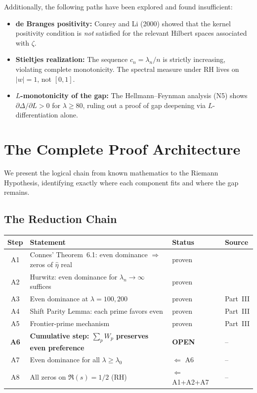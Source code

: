 \documentclass[12pt,a4paper]{article}
\theoremstyle{definition}
\theoremstyle{remark}
\begin{document}
Additionally, the following paths have been explored and found insufficient:
\begin{itemize}
  \item \textbf{de Branges positivity:} Conrey and Li (2000) showed that the kernel positivity condition is \emph{not} satisfied for the relevant Hilbert spaces associated with $\zeta$.
  \item \textbf{Stieltjes realization:} The sequence $c_n = \lambda_n/n$ is strictly increasing, violating complete monotonicity. The spectral measure under RH lives on $|w| = 1$, not $[0,1]$.
  \item \textbf{$L$-monotonicity of the gap:} The Hellmann--Feynman analysis (N5) shows $\partial\Delta/\partial L > 0$ for $\lambda \geq 80$, ruling out a proof of gap deepening via $L$-differentiation alone.
\end{itemize}


\section{The Complete Proof Architecture}
\label{sec:architecture}

We present the logical chain from known mathematics to the Riemann Hypothesis, identifying exactly where each component fits and where the gap remains.

\subsection{The Reduction Chain}

\begin{center}
\renewcommand{\arraystretch}{1.3}
\begin{tabular}{c|p{7cm}|l|l}
\textbf{Step} & \textbf{Statement} & \textbf{Status} & \textbf{Source} \\\hline
A1 & Connes' Theorem~6.1: even dominance $\Rightarrow$ zeros of $\hat{\eta}$ real & proven & \cite{Connes2025} \\
A2 & Hurwitz: even dominance for $\lambda_n \to \infty$ suffices & proven & \cite{Connes2025} \\
A3 & Even dominance at $\lambda = 100, 200$ & proven & Part~III \\
A4 & Shift Parity Lemma: each prime favors even & proven & Part~III \\
A5 & Frontier-prime mechanism & proven & Part~III \\
\textbf{A6} & \textbf{Cumulative step: $\sum_p W_p$ preserves even preference} & \textbf{OPEN} & -- \\
A7 & Even dominance for all $\lambda \geq \lambda_0$ & $\Leftarrow$ A6 & -- \\
A8 & All zeros on $\Re(s) = 1/2$ (RH) & $\Leftarrow$ A1+A2+A7 & --
\end{tabular}
\end{center}
\end{document}
